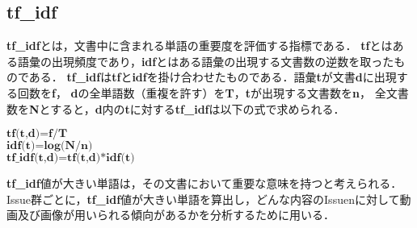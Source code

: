 \subsection{\textbf{tf\_idf}}
\textbf{tf\_idf}とは，文書中に含まれる単語の重要度を評価する指標である．
\textbf{tf}とはある語彙の出現頻度であり，\textbf{idf}とはある語彙の出現する文書数の逆数を取ったものである．
\textbf{tf\_idf}は\textbf{tf}と\textbf{idf}を掛け合わせたものである．語彙\textbf{t}が文書\textbf{d}に出現する回数を\textbf{f}，
\textbf{d}の全単語数（重複を許す）を\textbf{T}，\textbf{t}が出現する文書数を\textbf{n}，
全文書数を\textbf{N}とすると，\textbf{d}内の\textbf{t}に対する\textbf{tf\_idf}は以下の式で求められる．
\begin{center}
  $\textbf{tf(t,d)=f/T}$ \\
  $\textbf{idf(t)=log(N/n)}$ \\
  $\textbf{tf\_idf(t,d)=tf(t,d)*idf(t)}$
\end{center}

\textbf{tf\_idf}値が大きい単語は，その文書において重要な意味を持つと考えられる．
Issue群ごとに，\textbf{tf\_idf}値が大きい単語を算出し，どんな内容のIssuenに対して動画及び画像が用いられる傾向があるかを分析するために用いる．
